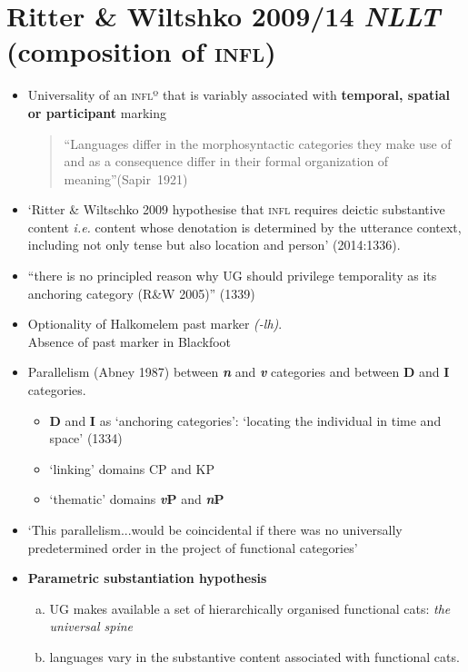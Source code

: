 \documentclass[10pt]{article}
\newcommand{\mcom}[1]
{\marginpar{\color{black}\raggedleft\raggedright\hspace{0pt}\linespread{0.9}\footnotesize{#1}}}
\begin{document}
\section{Ritter \& Wiltshko 2009/14 \textit{NLLT} (composition of \textsc{infl)}}
\begin{itemize}
	\item Universality of an \textsc{inflº}\mcom{this better be motivated} that is variably associated with \textbf{temporal, spatial or participant} marking

	\begin{quotation}
		``Languages differ in the morphosyntactic categories they make use of and as a consequence differ in their formal organization of meaning''\hfill(Sapir~1921)
	\end{quotation}
	\item `Ritter \& Wiltschko 2009 hypothesise that \textsc{infl} requires deictic substantive content \textit{i.e.} content whose denotation is determined by the utterance context, including not only tense but also location and person' (2014:1336).
	\item ``there is no principled reason why UG should privilege temporality as its anchoring category (R\&W 2005)'' (1339)
	\item Optionality of Halkomelem past marker \textit{(-lh)}.\\
	Absence of past marker in Blackfoot
	\item Parallelism (Abney 1987) between \textbf{\textit{n}} and \textbf{\textit{v}} categories and between \textbf{D} and \textbf{I} categories.
	\begin{itemize}
\item 		\textbf{D} and \textbf{I} as `anchoring categories': `locating the individual in time and space' (1334)
\item `linking' domains CP and KP
\item `thematic' domains \textbf{\textit{v}P} and \textbf{\textit{n}P}
	\end{itemize}
	\item `This parallelism...would be coincidental if there was no universally predetermined order in the project of functional categories'
	\item \textbf{Parametric substantiation hypothesis}
	\begin{enumerate}[a.]
		\item UG makes available a set of hierarchically organised functional cats: \textit{the universal spine}
		\item languages vary in the substantive content associated with functional cats.
	\end{enumerate}
\end{itemize}
\end{document}
